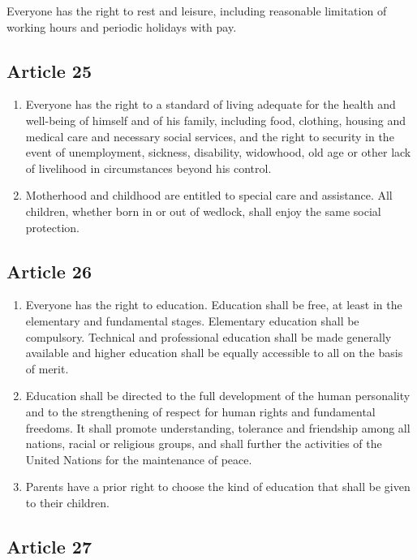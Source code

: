 \documentclass[
  ngerman,
  american,
  titlepage,
  openright,
  DIV=calc,
  toc=listof,
  listof=nochaptergap]{scrbook}
\begin{document}
Everyone has the right to rest and leisure, including reasonable
limitation of working hours and periodic holidays with pay.

\subsection{Article 25}\label{article-25-1}

\begin{enumerate}
\def\labelenumi{\arabic{enumi}.}
\item
  Everyone has the right to a standard of living adequate for the health
  and well-being of himself and of his family, including food, clothing,
  housing and medical care and necessary social services, and the right
  to security in the event of unemployment, sickness, disability,
  widowhood, old age or other lack of livelihood in circumstances beyond
  his control.
\item
  Motherhood and childhood are entitled to special care and assistance.
  All children, whether born in or out of wedlock, shall enjoy the same
  social protection.
\end{enumerate}

\subsection{Article 26}\label{article-26-1}

\begin{enumerate}
\def\labelenumi{\arabic{enumi}.}
\item
  Everyone has the right to education. Education shall be free, at least
  in the elementary and fundamental stages. Elementary education shall
  be compulsory. Technical and professional education shall be made
  generally available and higher education shall be equally accessible
  to all on the basis of merit.
\item
  Education shall be directed to the full development of the human
  personality and to the strengthening of respect for human rights and
  fundamental freedoms. It shall promote understanding, tolerance and
  friendship among all nations, racial or religious groups, and shall
  further the activities of the United Nations for the maintenance of
  peace.
\item
  Parents have a prior right to choose the kind of education that shall
  be given to their children.
\end{enumerate}

\subsection{Article 27}\label{article-27-1}
\end{document}
